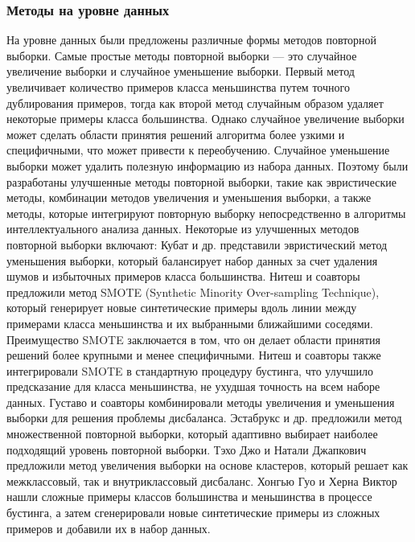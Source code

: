 \documentclass{article}
\begin{document}
\subsubsection{Методы на уровне данных }
На уровне данных были предложены различные формы методов повторной выборки. Самые простые методы повторной выборки — это случайное увеличение выборки и случайное уменьшение выборки. Первый метод увеличивает количество примеров класса меньшинства путем точного дублирования примеров, тогда как второй метод случайным образом удаляет некоторые примеры класса большинства. Однако случайное увеличение выборки может сделать области принятия решений алгоритма более узкими и специфичными, что может привести к переобучению. Случайное уменьшение выборки может удалить полезную информацию из набора данных. Поэтому были разработаны улучшенные методы повторной выборки, такие как эвристические методы, комбинации методов увеличения и уменьшения выборки, а также методы, которые интегрируют повторную выборку непосредственно в алгоритмы интеллектуального анализа данных.
Некоторые из улучшенных методов повторной выборки включают:
Кубат и др. представили эвристический метод уменьшения выборки, который балансирует набор данных за счет удаления шумов и избыточных примеров класса большинства. Нитеш и соавторы предложили метод SMOTE (Synthetic Minority Over-sampling Technique), который генерирует новые синтетические примеры вдоль линии между примерами класса меньшинства и их выбранными ближайшими соседями. Преимущество SMOTE заключается в том, что он делает области принятия решений более крупными и менее специфичными. Нитеш и соавторы также интегрировали SMOTE в стандартную процедуру бустинга, что улучшило предсказание для класса меньшинства, не ухудшая точность на всем наборе данных. Густаво и соавторы комбинировали методы увеличения и уменьшения выборки для решения проблемы дисбаланса. Эстабрукс и др. предложили метод множественной повторной выборки, который адаптивно выбирает наиболее подходящий уровень повторной выборки. Тэхо Джо и Натали Джапкович предложили метод увеличения выборки на основе кластеров, который решает как межклассовый, так и внутриклассовый дисбаланс. Хонгью Гуо и Херна Виктор нашли сложные примеры классов большинства и меньшинства в процессе бустинга, а затем сгенерировали новые синтетические примеры из сложных примеров и добавили их в набор данных.
\end{document}
